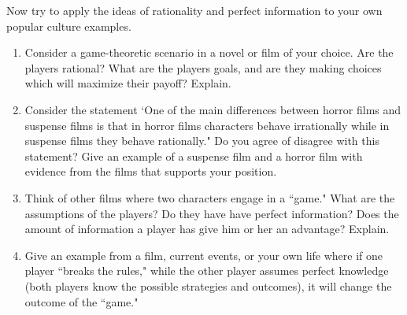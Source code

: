 Now try to apply the ideas of rationality and perfect information to your own popular culture examples.

\begin{enumerate}


\item Consider a game-theoretic scenario in a novel or film of your choice. Are the players rational? What are the players goals, and are they making choices which will maximize their payoff? Explain.

\item Consider the statement `One of the main differences between horror films and suspense films is that in horror films characters behave irrationally while in suspense films they behave rationally." Do you agree of disagree with this statement? Give an example of a suspense film and a horror film with evidence from the films that supports your position.

\item Think of other films where two characters engage in a ``game." What are the assumptions of the players? Do they have have perfect information? Does the amount of information a player has give him or her an advantage?  Explain.


\item Give an example from a film, current events, or your own life where if one player ``breaks the rules," while the other player assumes perfect knowledge (both players know the possible strategies and outcomes), it will change the outcome of the ``game."

\end{enumerate}




 